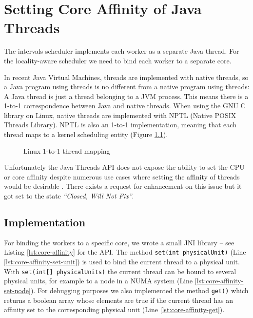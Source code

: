 
\chapter{Setting Core Affinity of Java Threads}
\label{chap:appendix-core-affinity}

The intervals scheduler implements each worker as a separate Java
thread. For the locality-aware scheduler we need to bind each worker
to a separate core.

In recent Java Virtual Machines, threads are implemented with native
threads, so a Java program using threads is no different from a native
program using threads: A Java thread is just a thread belonging to a
JVM process. This means there is a 1-to-1 correspondence between Java
and native threads. When using the GNU C library on Linux, native
threads are implemented with NPTL (Native POSIX Threads Library). NPTL
is also an 1-to-1 implementation, meaning that each thread maps to a
kernel scheduling entity (Figure
\ref{fig:core-affinity-thread-mapping}).

\begin{figure}[htb]
  \centering
  \caption{Linux 1-to-1 thread mapping}
  \label{fig:core-affinity-thread-mapping}
\end{figure}

Unfortunately the Java Threads API does not expose the ability to set
the CPU or core affinity despite numerous use cases where setting the
affinity of threads would be desirable \cite{Love2003, Dow2005,
  Foong2008}.  There exists a request for enhancement
\cite{Oracle1999} on this issue but it got set to the state
\emph{``Closed, Will Not Fix''}.


\section{Implementation}
\label{sec:appendix-core-affinity-implementation}

For binding the workers to a specific core, we wrote a small JNI
library -- see Listing \ref{lst:core-affinity} for the API. The method
\lstinline!set(int physicalUnit)!  (Line
\ref{lst:core-affinity-set-unit}) is used to bind the current thread
to a physical unit. With \lstinline!set(int[] physicalUnits)! the
current thread can be bound to several physical units, for example to
a node in a NUMA system (Line \ref{lst:core-affinity-set-node}). For
debugging purposes we also implemented the method \lstinline!get()!
which returns a boolean array whose elements are true if the current
thread has an affinity set to the corresponding physical unit (Line
\ref{lst:core-affinity-get}).

